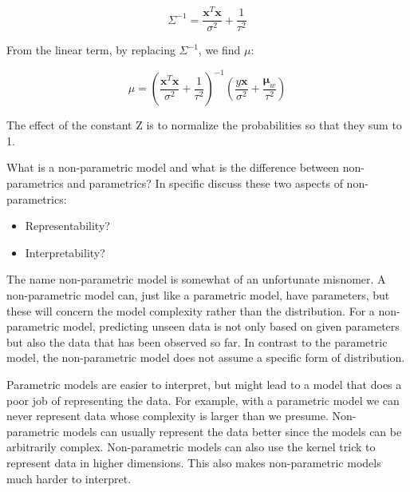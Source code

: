 \documentclass[12pt]{article}
\newenvironment{question}[2][Question]{\begin{trivlist}
\kern10pt
\item[\hskip \labelsep {\bfseries #1}\hskip \labelsep {\bfseries #2.}]}{\end{trivlist}}
\newcommand*{\answer}{%
  \par
  \kern1pt
  \begingroup
    \centering
    \raisebox{.2\baselineskip}{%
      \textcolor{gray}{
	    \rule{.6667\linewidth}{.1pt}%
      }
    }%
    \par
  \kern8pt
  \endgroup
}
\begin{document}
\begin{question}{6}
\begin{equation}
\Sigma^{-1} = \frac{\boldsymbol{x}^T\boldsymbol{x}}{\sigma^2} + \frac{1}{\tau^2}
\end{equation}

From the linear term, by replacing $\Sigma^{-1}$, we find $\mu$:

\begin{equation}
\mu = (\frac{\boldsymbol{x}^T\boldsymbol{x}}{\sigma^2}+\frac{1}{\tau^2})^{-1} (\frac{y\boldsymbol{x}}{\sigma^2} + \frac{\boldsymbol{\mu}_w}{\tau^2})
\end{equation}

The effect of the constant Z is to normalize the probabilities so that they sum to 1.
\end{question}

\begin{question}{7}
What is a non-parametric model and what is the difference between non-parametrics and parametrics? In specific discuss these two aspects of non-parametrics:

\begin{itemize}
\item Representability?
\item Interpretability?
\end{itemize}

\answer

The name non-parametric model is somewhat of an unfortunate misnomer. A non-parametric model can, just like a parametric model, have parameters, but these will concern the model complexity rather than the distribution. 
For a non-parametric model, predicting unseen data is not only based on given parameters but also the data that has been observed so far. In contrast to the parametric model, the non-parametric model does not assume a specific form of distribution. 

Parametric models are easier to interpret, but might lead to a model that does a poor job of representing the data. For example, with a parametric model we can never represent data whose complexity is larger than we presume.
Non-parametric models can usually represent the data better since the models can be arbitrarily complex. Non-parametric models can also use the kernel trick to represent data in higher dimensions. This also makes non-parametric models much harder to interpret.
\end{question}
\end{document}

